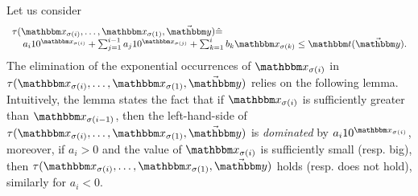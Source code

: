 Let us consider 
$$
\begin{array}{l}
\tau(\ivarx_{\sigma(i)}, \ldots, \ivarx_{\sigma(1)}, \vec{\ivary}) \Def  \\
\hspace{4mm} 
a_i 10^{\ivarx_{\sigma(i)}}+\sum_{j=1}^{i-1} a_j 10^{\ivarx_{\sigma(j)}} + \sum_{k=1}^{i}b_k \ivarx_{\sigma(k)} \le \iterm(\vec{\ivary}).
\end{array}
$$
%
The elimination of the exponential occurrences of $\ivarx_{\sigma(i)}$ in $\tau(\ivarx_{\sigma(i)}, \ldots, \ivarx_{\sigma(1)}, \vec{\ivary})$ relies on the following lemma. Intuitively, the lemma states the fact that if $\ivarx_{\sigma(i)}$ is sufficiently greater than $\ivarx_{\sigma(i-1)}$, then the left-hand-side of $\tau(\ivarx_{\sigma(i)}, \ldots, \ivarx_{\sigma(1)}, \vec{\ivary})$ is \emph{dominated} by $a_i10^{\ivarx_{\sigma(i)}}$, moreover, if $a_i > 0$ and the value of $\ivarx_{\sigma(i)}$ is sufficiently small (resp. big), then $\tau(\ivarx_{\sigma(i)}, \ldots, \ivarx_{\sigma(1)}, \vec{\ivary})$ holds (resp. does not hold), similarly for $a_i < 0$.

